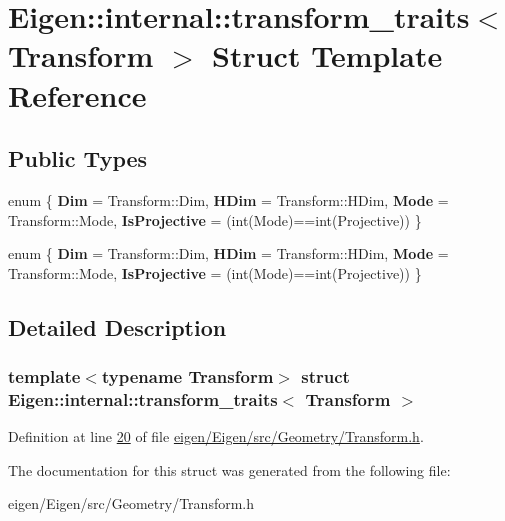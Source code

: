 \hypertarget{struct_eigen_1_1internal_1_1transform__traits}{}\section{Eigen\+:\+:internal\+:\+:transform\+\_\+traits$<$ Transform $>$ Struct Template Reference}
\label{struct_eigen_1_1internal_1_1transform__traits}
\subsection*{Public Types}
\begin{DoxyCompactItemize}
\item 
\mbox{\label{struct_eigen_1_1internal_1_1transform__traits_a892806ca1e88373227ea85f78cd2d8fa}} 
enum \{ {\bfseries Dim} = Transform\+:\+:Dim, 
{\bfseries H\+Dim} = Transform\+:\+:H\+Dim, 
{\bfseries Mode} = Transform\+:\+:Mode, 
{\bfseries Is\+Projective} = (int(Mode)==int(Projective))
 \}
\item 
\mbox{\label{struct_eigen_1_1internal_1_1transform__traits_a429812d936798b7dbf2aaaa0c9c98cba}} 
enum \{ {\bfseries Dim} = Transform\+:\+:Dim, 
{\bfseries H\+Dim} = Transform\+:\+:H\+Dim, 
{\bfseries Mode} = Transform\+:\+:Mode, 
{\bfseries Is\+Projective} = (int(Mode)==int(Projective))
 \}
\end{DoxyCompactItemize}


\subsection{Detailed Description}
\subsubsection*{template$<$typename Transform$>$\newline
struct Eigen\+::internal\+::transform\+\_\+traits$<$ Transform $>$}



Definition at line \hyperlink{eigen_2_eigen_2src_2_geometry_2_transform_8h_source_l00020}{20} of file \hyperlink{eigen_2_eigen_2src_2_geometry_2_transform_8h_source}{eigen/\+Eigen/src/\+Geometry/\+Transform.\+h}.



The documentation for this struct was generated from the following file\+:\begin{DoxyCompactItemize}
\item 
eigen/\+Eigen/src/\+Geometry/\+Transform.\+h\end{DoxyCompactItemize}
